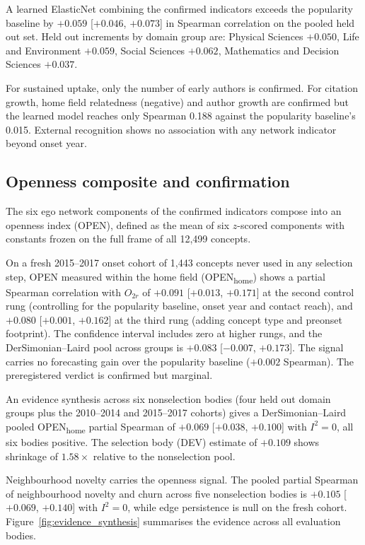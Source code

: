 \documentclass[11pt,letterpaper]{article}
\begin{document}
A learned ElasticNet combining the confirmed indicators exceeds the popularity
baseline by $+0.059$ [$+0.046$, $+0.073$] in Spearman correlation on the pooled
held out set. Held out increments by domain group are: Physical Sciences
$+0.050$, Life and
Environment $+0.059$, Social Sciences $+0.062$, Mathematics and Decision
Sciences $+0.037$.

For sustained uptake, only the number of early authors is confirmed. For
citation growth, home field relatedness (negative) and author growth are
confirmed but the learned model reaches only Spearman 0.188 against the popularity baseline's 0.015.
External recognition shows no association with any network indicator beyond
onset year.

\subsection{Openness composite and confirmation}

The six ego network components of the confirmed indicators compose into an
openness index (OPEN), defined as the mean of six $z$-scored components with
constants frozen on the full frame of all 12,499 concepts.

On a fresh 2015--2017 onset cohort of 1,443 concepts never used in any selection
step, OPEN measured within the home field (OPEN\textsubscript{home}) shows a
partial Spearman correlation with $O_{2r}$ of $+0.091$ [$+0.013$, $+0.171$] at
the second control rung (controlling for the popularity baseline, onset year and contact reach), and
$+0.080$ [$+0.001$, $+0.162$] at the third rung (adding concept type and
preonset footprint). The confidence interval includes zero at higher rungs, and
the DerSimonian--Laird pool across groups is $+0.083$ [$-0.007$, $+0.173$]. The
signal carries no forecasting gain over the popularity baseline ($+0.002$ Spearman). The
preregistered verdict is confirmed but marginal.

An evidence synthesis across six nonselection bodies (four held out domain
groups plus the 2010--2014 and 2015--2017 cohorts) gives a DerSimonian--Laird
pooled OPEN\textsubscript{home} partial Spearman of $+0.069$ [$+0.038$,
$+0.100$] with $I^2 = 0$, all six bodies positive. The selection body (DEV)
estimate of $+0.109$ shows shrinkage of $1.58\times$ relative to the
nonselection pool.

Neighbourhood novelty carries the openness signal. The pooled partial Spearman
of neighbourhood novelty and churn across five nonselection bodies is $+0.105$
[$+0.069$, $+0.140$] with $I^2 = 0$, while edge persistence is null on the
fresh cohort. Figure~\ref{fig:evidence_synthesis} summarises the evidence
across all evaluation bodies.
\end{document}
